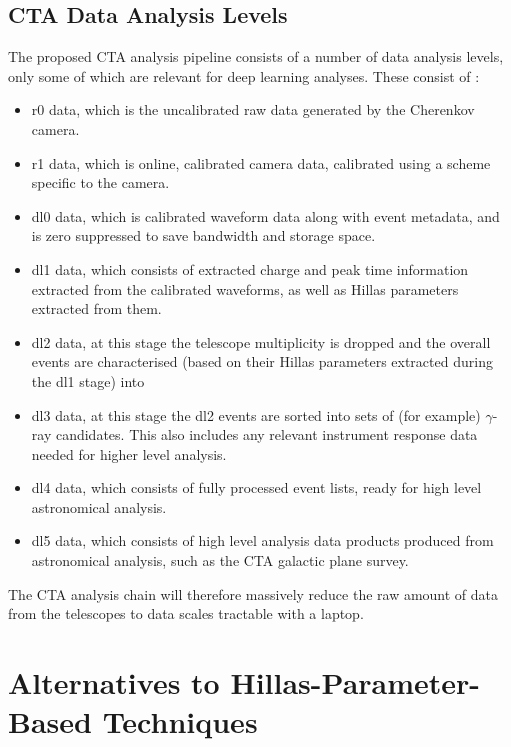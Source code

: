 \subsection{CTA Data Analysis Levels}

The proposed CTA analysis pipeline consists of a number of data analysis levels, only some of which are relevant for deep learning analyses. These consist of \cite{jasonthesis}:
\begin{itemize}
    \item r0 data, which is the uncalibrated raw data generated by the Cherenkov camera.
    \item r1 data, which is online, calibrated camera data, calibrated using a scheme specific to the camera.
    \item dl0 data, which is calibrated waveform data along with event metadata, and is zero suppressed to save bandwidth and storage space.
    \item dl1 data, which consists of extracted charge and peak time information extracted from the calibrated waveforms, as well as Hillas parameters extracted from them.
    \item dl2 data, at this stage the telescope multiplicity is dropped and the overall events are characterised (based on their Hillas parameters extracted during the dl1 stage) into 
    \item dl3 data, at this stage the dl2 events are sorted into sets of (for example) $\gamma$-ray candidates. This also includes any relevant instrument response data needed for higher level analysis.
    \item dl4 data, which consists of fully processed event lists, ready for high level astronomical analysis.
    \item dl5 data, which consists of high level analysis data products produced from astronomical analysis, such as the CTA galactic plane survey.
\end{itemize}

The CTA analysis chain will therefore massively reduce the raw amount of data from the telescopes to data scales tractable with a laptop.


\section{Alternatives to Hillas-Parameter-Based Techniques}

